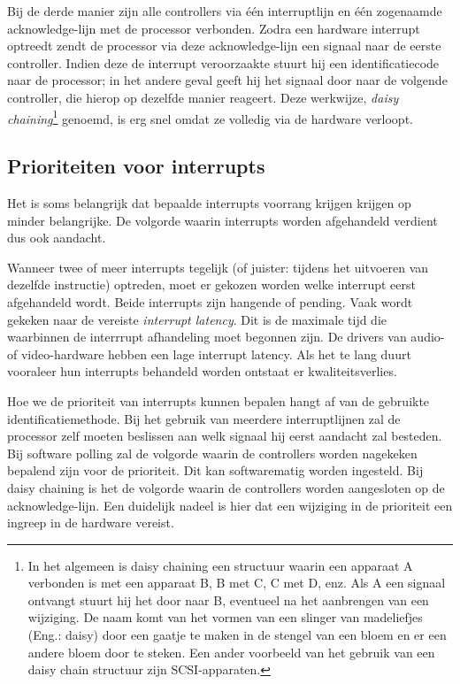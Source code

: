 Bij de derde manier zijn alle controllers via \'e\'en interruptlijn
en \'e\'en zogenaamde acknowledge-lijn met de processor verbonden. Zodra
een hardware interrupt optreedt zendt de processor via deze
acknowledge-lijn een signaal naar de eerste controller. Indien deze de
interrupt veroorzaakte stuurt hij een identificatiecode naar de
processor; in het andere geval geeft hij het signaal door naar de
volgende controller, die hierop op dezelfde manier reageert. Deze
werkwijze, \emph{daisy chaining}\footnote{In het algemeen is daisy chaining een
structuur waarin een apparaat A verbonden is met een apparaat B, B met C, C met
D, enz. Als A een signaal ontvangt stuurt hij het door naar B, eventueel na het
aanbrengen van een wijziging. De naam komt van het vormen van een slinger van
madeliefjes (Eng.: daisy) door een gaatje te maken in de stengel van een bloem
en er een andere bloem door te steken. Een ander voorbeeld van het gebruik van
een daisy chain structuur zijn SCSI-apparaten.} genoemd, is erg snel omdat ze
volledig via de hardware verloopt.

\subsection{Prioriteiten voor interrupts}

Het is soms belangrijk dat bepaalde interrupts voorrang krijgen
krijgen op minder belangrijke. De volgorde waarin interrupts worden
afgehandeld verdient dus ook aandacht.

Wanneer twee of meer interrupts tegelijk (of juister: tijdens
het uitvoeren van dezelfde instructie) optreden, moet er gekozen
worden welke interrupt eerst afgehandeld wordt. Beide interrupts zijn
hangende of pending. Vaak wordt gekeken naar de vereiste
\emph{interrupt latency}. Dit is de maximale tijd die
waarbinnen de interrrupt afhandeling moet begonnen zijn. De drivers
van audio- of video-hardware hebben een lage interrupt latency. Als
het te lang duurt vooraleer hun interrupts behandeld worden ontstaat
er kwaliteitsverlies.

Hoe we de prioriteit van interrupts kunnen bepalen hangt af van
de gebruikte identificatiemethode. Bij het gebruik van meerdere
interruptlijnen zal de processor zelf moeten beslissen aan welk
signaal hij eerst aandacht zal besteden. Bij software polling zal de
volgorde waarin de controllers worden nagekeken bepalend zijn voor de
prioriteit. Dit kan softwarematig worden ingesteld. Bij daisy chaining
is het de volgorde waarin de controllers worden aangesloten op de
acknowledge-lijn. Een duidelijk nadeel is hier dat een wijziging in de
prioriteit een ingreep in de hardware vereist.

